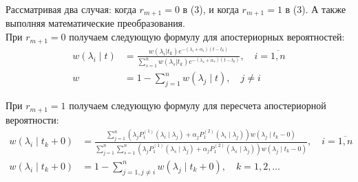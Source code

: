 \documentclass{beamer}
\begin{document}
\begin{frame}
    Рассматривая два случая: когда \(r_{m+1}=0\) в (3), и когда \(r_{m+1}=1\) в (3). А также выполняя математические преобразования.\\
    
    При \(r_{m+1}=0\) получаем следующую формулу для апостериорных вероятностей:
    \begin{equation}
        \begin{aligned}
        w(\lambda_i\mid t)&=\frac{w(\lambda_i|t_k)e^{-(\lambda_i+\alpha_i)(t-t_k)}}{\sum\limits_{s=1}^{n}w(\lambda_s|t_k)e^{-(\lambda_s+\alpha_s)(t-t_k)}}, \quad i=\overline{1,n} \\
        w&=1-\sum_{j=1}^nw(\lambda_j\mid t), \quad j\ne i
        \end{aligned}
    \end{equation}
\end{frame}

\begin{frame}
    При \(r_{m+1}=1\) получаем следующую формулу для пересчета апостериорной вероятности:
    \begin{equation}
        \begin{aligned}
            w(\lambda_i\mid t_k+0)&=\frac{\sum\limits_{j=1}^{n}(\lambda_jP_1^{(1)}(\lambda_i\mid\lambda_j)+\alpha_jP_1^{(2)}(\lambda_i\mid\lambda_j))w(\lambda_j\mid t_k-0)}{\sum\limits_{j=1}^n\sum\limits_{s=1}^{n}(\lambda_jP_1^{(1)}(\lambda_s\mid\lambda_j)+\alpha_jP_1^{(2)}(\lambda_s\mid\lambda_j))w(\lambda_j\mid t_k-0)},\quad i=\overline{1,n} \\
            w(\lambda_i\mid t_k+0)&=1-\sum_{j=1,j\ne i}^{n}w(\lambda_j\mid t_k+0), \quad k=1,2,\dots 
        \end{aligned}
    \end{equation}
\end{frame}
\end{document}
